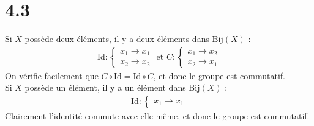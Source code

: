 \documentclass[11pt, a4paper, twoside]{article}
\newcommand{\Bij}{\mathrm{Bij}}
\newcommand{\Id}{\mathrm{Id}}
\begin{document}
\section*{4.3}
Si $X$ possède deux éléments, il y a deux éléments dans $\Bij(X)$ :
\begin{align*}
\Id:
\begin{cases}
x_1 \to x_{1}\\
x_2 \to x_2
\end{cases}
\text{ et } 
C:
\begin{cases}
x_1 \to x_2\\
x_2 \to x_1
\end{cases}
\end{align*}
On vérifie facilement que $C \circ \Id = \Id \circ C$, et donc le groupe est commutatif.\\
Si $X$ possède un élément, il y a un élément dans $\Bij(X)$ :
\begin{align*}
\Id:
\begin{cases}
x_1 \to x_1
\end{cases}
\end{align*}
Clairement l'identité commute avec elle même, et donc le groupe est commutatif.





\end{document}
